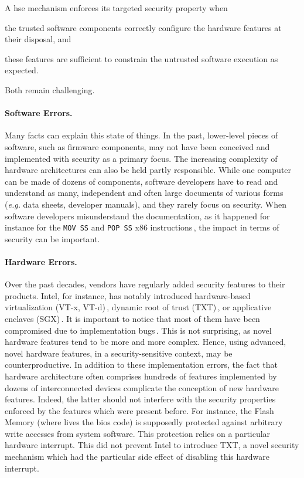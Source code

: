 A \ac{hse} mechanism enforces its targeted security property when
%
\begin{inparaenum}[(1)]
\item the trusted software components correctly configure the hardware features
  at their disposal, and
%
\item these features are sufficient to constrain the untrusted software
  execution as expected.
\end{inparaenum}
%
Both remain challenging.

\paragraph{Software Errors.}
%

Many facts can explain this state of things.
%
In the past, lower-level pieces of software, such as firmware components, may
not have been conceived and implemented with security as a primary focus.
%
The increasing complexity of hardware architectures can also be held partly
responsible.
%
While one computer can be made of dozens of components, software developers have
to read and understand as many, independent and often large documents of various
forms (\emph{e.g.} data sheets, developer manuals), and they rarely focus on
security.
%
When software developers misunderstand the documentation, as it happened for
instance for the \texttt{MOV SS} and \texttt{POP SS} x86
instructions\,\cite{movsspopss}, the impact in terms of security can be
important.

\paragraph{Hardware Errors.}
%
Over the past decades, vendors have regularly added security features to their
products.
%
Intel, for instance, has notably introduced hardware-based virtualization (VT-x,
VT-d)\,\cite{intel2014manualvt}, dynamic root of trust
(TXT)\,\cite{intel2015txt}, or applicative enclaves
(SGX)\,\cite{intel2014manualsgx,costan2016sgxexplained}.
%
It is important to notice that most of them have been compromised due to
implementation bugs\,\cite{wojtczuk2011txtbug,sang2010iommu}.
%
This is not surprising, as novel hardware features tend to be more and more
complex.
%
Hence, using advanced, novel hardware features, in a security-sensitive context,
may be counterproductive.
%
In addition to these implementation errors, the fact that hardware architecture
often comprises hundreds of features implemented by dozens of interconnected
devices complicate the conception of new hardware features.
%
Indeed, the latter should not interfere with the security properties enforced by
the features which were present before.
%
For instance, the Flash Memory (where lives the \ac{bios} code) is supposedly
protected against arbitrary write accesses from system software.
%
This protection relies on a particular hardware interrupt.
%
This did not prevent Intel to introduce TXT, a novel security mechanism which
had the particular side effect of disabling this hardware interrupt.

